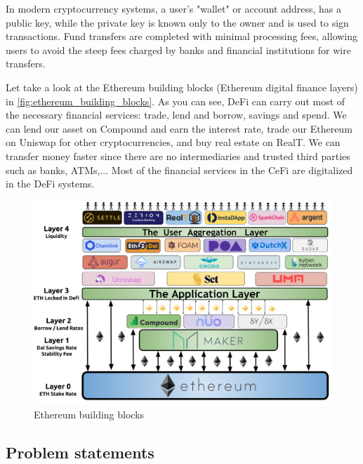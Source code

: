 In modern cryptocurrency systems, a user's "wallet" or account address, has a public key, while the private key is known only to the owner and is used to sign transactions. Fund transfers are completed with minimal processing fees, allowing users to avoid the steep fees charged by banks and financial institutions for wire transfers.




Let take a look at the Ethereum building blocks (Ethereum digital finance layers) in \autoref{fig:ethereum_building_blocks}. As you can see, DeFi can carry out most of the necessary financial services: trade, lend and borrow, savings and spend. We can lend our asset on Compound and earn the interest rate, trade our Ethereum on Uniswap for other cryptocurrencies, and buy real estate on RealT. We can transfer money faster since there are no intermediaries and trusted third parties such as banks, ATMs,... Most of the financial services in the CeFi are digitalized in the DeFi systems.

\begin{figure}[ht!]
  \centering
  \includegraphics[width=.75\textwidth]{images/ethereum_building_blocks.png}
  \caption[Ethereum building blocks]{Ethereum building blocks}
  \label{fig:ethereum_building_blocks}
\end{figure}


\subsection{Problem statements}


